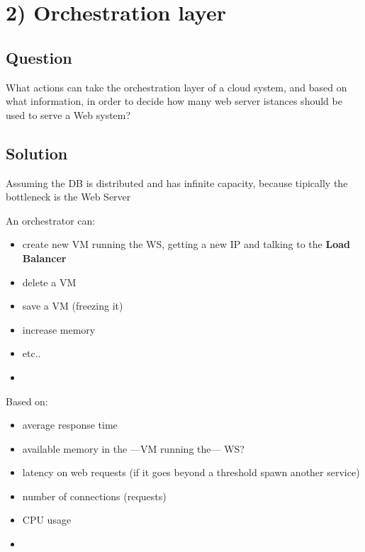 \hypertarget{orchestration-layer-1}{%
\section{2) Orchestration layer}\label{orchestration-layer-1}}

\hypertarget{question-1}{%
\subsection{Question}\label{question-1}}

What actions can take the orchestration layer of a cloud system, and
based on what information, in order to decide how many web server
istances should be used to serve a Web system?


\hypertarget{solution-1}{%
\subsection{Solution}\label{solution-1}}

Assuming the DB is distributed and has infinite capacity, because
tipically the bottleneck is the Web Server

{\ns An orchestrator can:
\begin{itemize}
\item
  create new VM running the WS, getting a new IP and talking to the
  \textbf{Load Balancer}
\item
  delete a VM
\item
  save a VM (freezing it)
\item
  increase memory
\item
  etc..
\item {}
\end{itemize}}

{\ns Based on:
\begin{itemize}
\item
  average response time
\item
  available memory in the ---VM running the--- WS? 
\item
  latency on web requests (if it goes beyond a threshold spawn another service)
\item
  number of connections (requests)
\item
  CPU usage
\item {}
\end{itemize}}

